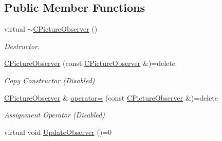 \subsection*{Public Member Functions}
\begin{DoxyCompactItemize}
\item 
\hypertarget{class_c_picture_observer_a86036f6ad66ae4bad3f204f61d234f46}{virtual \hyperlink{class_c_picture_observer_a86036f6ad66ae4bad3f204f61d234f46}{$\sim$\+C\+Picture\+Observer} ()}\label{class_c_picture_observer_a86036f6ad66ae4bad3f204f61d234f46}

\begin{DoxyCompactList}\small\item\em Destructor. \end{DoxyCompactList}\item 
\hypertarget{class_c_picture_observer_a7c0cae97a7c165b98a00aeb2892cd6e7}{\hyperlink{class_c_picture_observer_a7c0cae97a7c165b98a00aeb2892cd6e7}{C\+Picture\+Observer} (const \hyperlink{class_c_picture_observer}{C\+Picture\+Observer} \&)=delete}\label{class_c_picture_observer_a7c0cae97a7c165b98a00aeb2892cd6e7}

\begin{DoxyCompactList}\small\item\em Copy Constructor (Disabled) \end{DoxyCompactList}\item 
\hypertarget{class_c_picture_observer_a200c66fe9ab13e18e9559033165b1895}{\hyperlink{class_c_picture_observer}{C\+Picture\+Observer} \& \hyperlink{class_c_picture_observer_a200c66fe9ab13e18e9559033165b1895}{operator=} (const \hyperlink{class_c_picture_observer}{C\+Picture\+Observer} \&)=delete}\label{class_c_picture_observer_a200c66fe9ab13e18e9559033165b1895}

\begin{DoxyCompactList}\small\item\em Assignment Operator (Disabled) \end{DoxyCompactList}\item 
\hypertarget{class_c_picture_observer_a0dce27216a8cb8a2490f0efc83a5994a}{virtual void \hyperlink{class_c_picture_observer_a0dce27216a8cb8a2490f0efc83a5994a}{Update\+Observer} ()=0}\label{class_c_picture_observer_a0dce27216a8cb8a2490f0efc83a5994a}


\end{DoxyCompactItemize}
